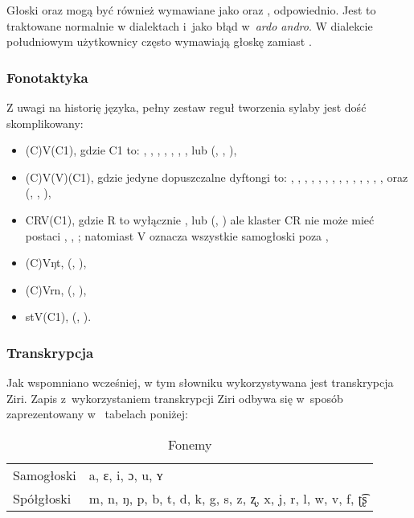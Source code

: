 \begin{spacing}{1.1}
Głoski  oraz  mogą być również wymawiane jako  oraz ,
odpowiednio. Jest to traktowane normalnie w dialektach i~jako błąd w~\emph{ardo
andro}. W dialekcie południowym użytkownicy często wymawiają głoskę 
zamiast .

\subsubsection{Fonotaktyka}

Z uwagi na historię języka, pełny zestaw reguł tworzenia sylaby jest dość
skomplikowany:

\begin{itemize}
	\item (C)V(C1), gdzie C1 to: , , , , , , ,  lub  (, , ),
	\item (C)V(V)(C1), gdzie jedyne dopuszczalne dyftongi to: , , , , , , , , , , , , , ,  oraz  (, , ),
	\item CRV(C1), gdzie R to wyłącznie ,  lub  (, ) ale klaster CR nie może mieć postaci , , ; natomiast V oznacza wszystkie samogłoski poza ,
	\item (C)Vŋt, (, ),
	\item (C)Vrn, (, ),
	\item stV(C1), (, ).
\end{itemize}

\subsubsection{Transkrypcja}

Jak wspomniano wcześniej, w tym słowniku wykorzystywana jest transkrypcja Ziri. 
Zapis z~wykorzystaniem transkrypcji Ziri odbywa się w~sposób zaprezentowany w~
tabelach poniżej:

\begin{table}[ht]
	\centering
	\caption{Fonemy}
	\begin{tabular}{ll} \toprule
		Samogłoski & a, ɛ, i, ɔ, u, ʏ \\
		Spółgłoski & m, n, ŋ, p, b, t, d, k, g, s, z, ʐ, x, j, r, l, w, v, f, ʈ͡ʂ \\\bottomrule
	\end{tabular}
	\label{tab:phonemes}
\end{table}


\end{spacing}

